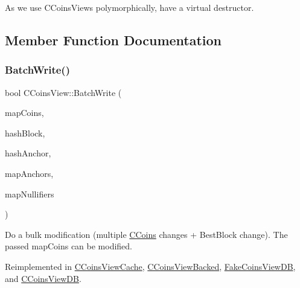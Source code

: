 As we use C\+Coins\+Views polymorphically, have a virtual destructor. 



\subsection{Member Function Documentation}
\mbox{\label{class_c_coins_view_a6e0ef2f996f5bf9f15c4fcae89333c7d}} 
\subsubsection{\texorpdfstring{Batch\+Write()}{BatchWrite()}}
{\footnotesize\ttfamily bool C\+Coins\+View\+::\+Batch\+Write (\begin{DoxyParamCaption}\item[{\mbox{\hyperlink{coins_8h_a2886ba2fd0428bae777e1cbcabc02834}{C\+Coins\+Map}} \&}]{map\+Coins,  }\item[{const \mbox{\hyperlink{classuint256}{uint256}} \&}]{hash\+Block,  }\item[{const \mbox{\hyperlink{classuint256}{uint256}} \&}]{hash\+Anchor,  }\item[{\mbox{\hyperlink{coins_8h_a070827cc9d21a91b8f4f4f52a6f7c848}{C\+Anchors\+Map}} \&}]{map\+Anchors,  }\item[{\mbox{\hyperlink{coins_8h_ab651cc287e9594190ef77d2fca2b14c7}{C\+Nullifiers\+Map}} \&}]{map\+Nullifiers }\end{DoxyParamCaption})\hspace{0.3cm}{\ttfamily [virtual]}}

Do a bulk modification (multiple \mbox{\hyperlink{class_c_coins}{C\+Coins}} changes + Best\+Block change). The passed map\+Coins can be modified. 

Reimplemented in \mbox{\hyperlink{class_c_coins_view_cache_a3d661381b7eb233a8a13ea11ec5dac51}{C\+Coins\+View\+Cache}}, \mbox{\hyperlink{class_c_coins_view_backed_ae0f10af7d1cd7706f57628c38426c75c}{C\+Coins\+View\+Backed}}, \mbox{\hyperlink{class_fake_coins_view_d_b_a1108b45f9d165344c7378051e061147b}{Fake\+Coins\+View\+DB}}, and \mbox{\hyperlink{class_c_coins_view_d_b_ab617e4b898f06cec79a2a26fdca9efbd}{C\+Coins\+View\+DB}}.

\mbox{\label{class_c_coins_view_a2fcf3f99111eef1c41243f54f94d3be8}} 
